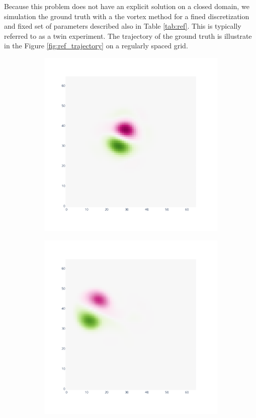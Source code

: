 Because this problem does not have an explicit solution on a closed domain, we simulation the ground truth with a the vortex method for a fined discretization and fixed set of parameters described also in Table \ref{tab:ref}. This is typically referred to as a twin experiment. The trajectory of the ground truth is illustrate in the Figure \ref{fig:ref_trajectory} on a regularly spaced grid.

\begin{figure}[htbp]
	\begin{subfigure}{0.32\textwidth}
		\includegraphics[width=\linewidth]{images/app2d/best_estimate_2.pdf}
	\end{subfigure}
	\hfill
	\begin{subfigure}{0.32\textwidth}
		\includegraphics[width=\linewidth]{images/app2d/best_estimate_10.pdf}

\end{subfigure}
\end{figure}

